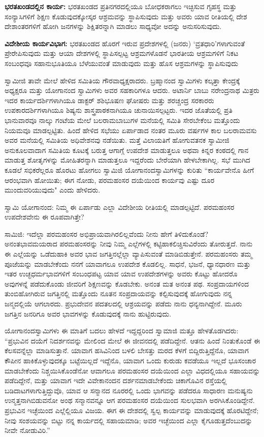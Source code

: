 \textbf{ಭರತಖಂಡದಲ್ಲಿನ ಕಾರ್ಯ:} ಭರತಖಂಡದ ಪ್ರತಿನಗರದಲ್ಲಿಯೂ ಬೋಧಕರಾಗಲು ಇಚ್ಛಿಸುವ ಗೃಹಸ್ಥ ಮತ್ತು ಸಂನ್ಯಾಸಿಗಳಿಗೆ ಶಿಕ್ಷಣ ಕೊಡುವುದಕ್ಕೋಸ್ಕರ ಆಶ್ರಮವನ್ನು ಸ್ಥಾಪಿಸುವುದು ಮತ್ತು ಅವರು ಯಾವ ರೀತಿಯಲ್ಲಿ ದೇಶ ದೇಶಾಂತರಗಳಿಗೆ ಹೋಗಿ ಜನಗಳನ್ನು ಶಿಕ್ಷಿತರನ್ನಾಗಿ ಮಾಡಲು ಸಾಧ್ಯವೋ ಅದನ್ನು ಅನುಸರಿಸುವುದು.

\textbf{ವಿದೇಶೀಯ ಕಾರ್ಯವಿಭಾಗ:} ಭರತಖಂಡದ ಹೊರಗೆ ಇರುವ ಪ್ರದೇಶಗಳಲ್ಲಿ (ಜನರು) ‘ವ್ರತಧಾರಿ’ಗಳಾಗುವಂತೆ ಪ್ರೇರೇಪಿಸುವುದು ಮತ್ತು ಆಯಾ ದೇಶಗಳಲ್ಲಿ ಸ್ಥಾಪಿಸಲ್ಪಟ್ಟ ಆಶ್ರಮಗಳೊಡನೆ ಭಾರತೀಯ ಆಶ್ರಮಗಳಿಗೆ ನಿಕಟ ಸಂಬಂಧವೂ ಸಹಾನುಭೂತಿಯೂ ಬೆಳೆಯುವಂತೆ ಮಾಡುವುದು ಮತ್ತು ಹೊಸ ಆಶ್ರಮಗಳನ್ನು ಸ್ಥಾಪಿಸುವುದು

ಸ್ವಾಮೀಜಿ ತಾವೇ ಮೇಲೆ ಹೇಳಿದ ಸಮಿತಿಯ ಗೌರವಾಧ್ಯಕ್ಷರಾದರು. ಬ್ರಹ್ಮಾನಂದ ಸ್ವಾಮಿಗಳು ಕಲ್ಕತ್ತಾ ಕೇಂದ್ರಕ್ಕೆ ಅಧ್ಯಕ್ಷರೂ ಮತ್ತು ಯೋಗಾನಂದ ಸ್ವಾಮಿಗಳು ಅವರ ಸಹಕಾರಿಗಳೂ ಆದರು. ಅಟಾರ್ನಿ ಬಾಬು ನರೇಂದ್ರನಾಥ ಮಿತ್ರರು ಇದರ ಕಾರ್ಯದರ್ಶಿಗಳಾಗಿಯೂ ಡಾಕ್ಟರ್ ಶಶಿಭೂಷಣ ಘೋಷರು ಮತ್ತು ಶರಚ್ಚಂದ್ರ ಸರಕಾರರು ಉಪಕಾರದರ್ಶಿಗಳಾಗಿಯೂ ಶಿಷ್ಯನು ಶಾಸ್ತ್ರಪಾಠಕನಾಗಿಯೂ ಚುನಾಯಿಸಲ್ಪಟ್ಟರು. ಇದರ ಜೊತೆಯಲ್ಲಿ ಪ್ರತಿ ಭಾನುವಾರವೂ ನಾಲ್ಕು ಗಂಟೆಯ ಮೇಲೆ ಬಲರಾಮಬಾಬುಗಳ ಮನೆಯಲ್ಲಿ ಸಮಿತಿ ಸೇರಬೇಕೆಂಬ ಮತ್ತೊಂದು ನಿಯಮವೂ ಮಾಡಲ್ಪಟ್ಟಿತು. ಹಿಂದೆ ಹೇಳಿದ ಸಭೆಯು ಏರ್ಪಾಡಾದ ನಂತರ ಮೂರು ವರ್ಷಗಳ ಕಾಲ ಬಲರಾಮವಸು ಅವರ ಮನೆಯಲ್ಲಿ ಸಮಿತಿಯ ಅಧಿವೇಶನವು ನಡೆಯಿತು. ಮತ್ತೆ ವಿಲಾಯತಿಗೆ ಹೋಗುವತನಕ ಸ್ವಾಮೀಜಿ ಅನುಕೂಲವಾದಾಗ ಸಮಿತಿಯ ಕೂಟಕ್ಕೆ ಬರುತ್ತ ಆಗಾಗ್ಗೆ ಉಪದೇಶ ಮಾಡುತ್ತಲೂ ಅಥವಾ ಕಿನ್ನರ ಕಂಠದಲ್ಲಿ ಗಾನ ಮಾಡುತ್ತ ಶೋತೃಗಳನ್ನು ಮೋಹಿತರನ್ನಾಗಿ ಮಾಡುತ್ತಲೂ ಇದ್ದರೆಂದು ಬೇರೆಯಾಗಿ ಹೇಳಬೇಕಾಗಿಲ್ಲ. ಸಭೆ ಮುಗಿದ ಕೂಡಲೆ ಸಭಿಕರೆಲ್ಲರೂ ಹೊರಟು ಹೋಗಲು ಸ್ವಾಮಿಜಿ ಯೋಗಾನಂದಸ್ವಾಮಿಗಳನ್ನು ಕುರಿತು “ಕಾರ್ಯವೇನೊ ಹೀಗೆ ಆರಂಭವಾಗಿ ಹೋಯಿತು; ಈಗ ನೋಡು, ಪರಮಹಂಸರ ದಯೆಯಿಂದ ಕಾರ್ಯವು ಎಷ್ಟು ದೂರ ಮುಂದುವರಿಯುವುದು" ಎಂದು ಹೇಳಿದರು.

ಸ್ವಾಮಿ ಯೋಗಾನಂದ: ನಿಮ್ಮ ಈ ಏರ್ಪಾಡು ಎಲ್ಲಾ ವಿದೇಶೀಯ ರೀತಿಯಲ್ಲಿ ಮಾಡಲ್ಪಟ್ಟಿದೆ. ಪರಮಹಂಸರ ಉಪದೇಶವೇನು ಈ ರೂಪವಾಗಿತ್ತೇ?

ಸಾಮಿಜಿ: ಇದೆಲ್ಲಾ ಪರಮಹಂಸರ ಅಭಿಪ್ರಾಯವಾಗಿರಲಿಲ್ಲವೆಂದು ನೀನು ಹೇಗೆ ತಿಳಿದುಕೊಂಡೆ? ಅನಂತಭಾವಮಯರಾದ ಪರಮಹಂಸರನ್ನು ನೀವು ನಿಮ್ಮ ಎಲ್ಲೆಗಳಲ್ಲಿ ಕಟ್ಟಿಹಾಕಲಿಚ್ಚಿಸುವಿರೆಂದು ತೋರುತ್ತದೆ. ನಾನು ಈ ಎಲ್ಲೆಯನ್ನು ಒಡೆದುಹಾಕಿ ಅವರ ಭಾವ ಜಗತ್ತಿನಲ್ಲೆಲ್ಲಾ ವ್ಯಾಪಿಸುವಂತೆ ಮಾಡಿಬಿಡುತ್ತೇನೆ. ಪರಮಹಂಸರು ತಮ್ಮ ಪೂಜೆಯನ್ನು ಮಾಡಬೇಕೆಂದು ನನಗೆ ಯಾವಾಗಲೂ ಉಪದೇಶ ಕೊಡಲಿಲ್ಲ. ಸಾಧನೆ, ಭಜನೆ, ಧ್ಯಾನಧಾರಣ ಮತ್ತು ಇತರ ಉಚ್ಛಧರ್ಮಭಾವಗಳಿಗೆ ಸಂಬಂಧಪಟ್ಟ ಯಾವ ಯಾವ ಉಪದೇಶಗಳನ್ನು ಅವರು ಕೊಟ್ಟು ಹೋದರೊ ಅವುಗಳನ್ನೆ ಪಡೆದುಕೊಂಡು ಜೀವರಿಗೆ ಶಿಕ್ಷಣವನ್ನು ಕೊಡಬೇಕು. ಅನಂತ ಮತ ಅನಂತ ಪಥ. ಸಂಪ್ರದಾಯಗಳಿಂದ ತುಂಬಿಹೋಗಿರುವ ಜಗತ್ತಿನಲ್ಲಿ ಮತ್ತೊಂದು ನೂತನ ಸಂಪ್ರದಾಯವನ್ನು ಕಲ್ಪಿಸುವುದಕ್ಕೆ ಹೋಗುವುದು ನನ್ನ ಜನ್ಮದಲ್ಲಿಯೆ ಆಗಲಾರದು. ಪ್ರಭುದೇವನ ಪದತಲದಲ್ಲಿ ಆಶ್ರಯವನ್ನು ಪಡೆದು ನಾನು ಧನ್ಯನಾಗಿದ್ದೇನೆ. ಮೂರು ಜಗತ್ತಿನ ಜನರಿಗೂ ಅವರ ಭಾವಗಳನ್ನು ಕೊಡುವುದಕ್ಕೆ ನಾನು ಹುಟ್ಟಿರುವುದು.

ಯೋಗಾನಂದಸ್ವಾಮಿಗಳು ಈ ಮಾತಿಗೆ ಬದಲು ಹೇಳದೆ ಇದ್ದದ್ದರಿಂದ ಸ್ವಾಮಾಜಿ ಮತ್ತೂ ಹೇಳತೊಡಗಿದರು: “ಪ್ರಭುವಿನ ದಯೆಗೆ ನಿದರ್ಶನವನ್ನು ಮೇಲಿಂದ ಮೇಲೆ ಈ ಜೀವನದಲ್ಲಿ ಪಡೆದಿದ್ದೇನೆ. ಆತನು ಹಿಂದೆ ನಿಂತುಕೊಂಡೆ ಈ ಕೆಲಸವನ್ನೆಲ್ಲಾ ಮಾಡಿಸುತ್ತಾನೆ. ಯಾವಾಗ ಹಸಿವಿನಿಂದ ಬಳಲಿ ಬೇಸತ್ತು ಮರದ ಕೆಳಗೆ ಬಿದ್ದಿರುತ್ತಿದ್ದೆನೊ, ಯಾವಾಗ ಕೌಪೀನ ಹಾಕಿಕೊಳ್ಳುವುದಕ್ಕೂ ಬಟ್ಟೆಯಿಲ್ಲದೆ ಇದ್ದೆನೊ, ಯಾವಾಗ ಒಂದು ಕುರುಡು ಕವಡೆಯೂ ಇಲ್ಲದೆ ಭೂಸಂಚಾರ ಮಾಡಬೇಕೆಂದು ನಿಶ್ಚಯಿಸಿಕೊಂಡೆನೋ ಆವಾಗಲೂ ಪರಮಹಂಸರ ದಯೆಯಿಂದ ಎಲ್ಲಾ ವಿಧದಲ್ಲಿಯೂ ಸಹಾಯವನ್ನು ಪಡೆದಿದ್ದೇನೆ, ಮತ್ತು ಯಾವಾಗ ಇದೇ ವಿವೇಕಾನಂದನ ದರ್ಶನಮಾಡಬೇಕೆಂದು ಚಿಕಾಗೊವಿನ ರಸ್ತೆಯಲ್ಲಿ ಬಡಿದಾಟಗಳಾಗುತ್ತಿದ್ದುವೊ, ಯಾವ ಆ ಸನ್ಮಾನದ ನೂರರಲ್ಲಿ ಒಂದು ಭಾಗವನ್ನು ಪಡೆದರೂ ಸಾಧಾರಣ ಮನುಷ್ಯನು ಉನ್ಮತ್ತನಾಗಿಬಿಡುವನೋ ಅಂಥ ಸನ್ಮಾನವನ್ನೂ ಆಗ ಪರಮಹಂಸರ ದಯೆಯಿಂದ ಸುಲಭವಾಗಿ ಅರಗಿಸಿಕೊಂಡಿದ್ದೇನೆ. ಪ್ರಭುವಿನ ಇಚ್ಛೆಯಿಂದ ಎಲ್ಲೆಲ್ಲಿಯೂ ವಿಜಯ. ಈಗ ಈ ದೇಶದಲ್ಲಿ ಸ್ವಲ್ಪ ಕಾರ್ಯವನ್ನು ಮಾಡುವುದಕ್ಕೆ ಹೊರಟಿದ್ದೇನೆ; ನೀವು ಸಂಶಯವನ್ನು ಬಿಟ್ಟು ನನ್ನ ಕಾರ್ಯದಲ್ಲಿ ಸಹಾಯಮಾಡಿ; ಅವರ ಇಚ್ಛೆಯಿಂದ ಎಲ್ಲಾ ಕೈಗೂಡುತ್ತದೆಂಬುದನ್ನು ನೀವೇ ನೋಡುವಿರಿ.”

